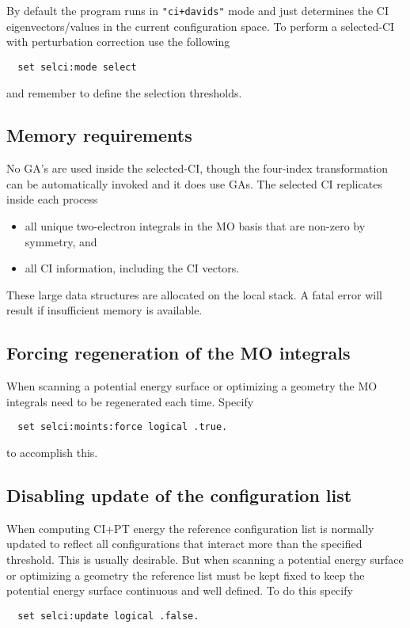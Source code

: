By default the program runs in \verb="ci+davids"= mode and just
determines the CI eigenvectors/values in the current configuration
space.  To perform a selected-CI with perturbation correction use the
following
\begin{verbatim}
  set selci:mode select
\end{verbatim}
and remember to define the selection thresholds.

\subsection{Memory requirements}

No GA's are used inside the selected-CI, though the four-index
transformation can be automatically invoked and it does use GAs.  The
selected CI replicates inside each process
\begin{itemize}
\item all unique two-electron integrals in the MO basis that are
  non-zero by symmetry, and
\item all CI information, including the CI vectors.
\end{itemize}
These large data structures are allocated on the local stack.  A fatal
error will result if insufficient memory is available.


\subsection{Forcing regeneration of the MO integrals}

When scanning a potential energy surface or optimizing a geometry the
MO integrals need to be regenerated each time.  Specify
\begin{verbatim}
  set selci:moints:force logical .true.
\end{verbatim}
to accomplish this.

\subsection{Disabling update of the configuration list}

When computing CI+PT energy the reference configuration list is
normally updated to reflect all configurations that interact more than
the specified threshold.  This is usually desirable.  But
when scanning a potential energy surface or optimizing a geometry the
reference list must be kept fixed to keep the potential energy surface
continuous and well defined.  To do this specify
\begin{verbatim}
  set selci:update logical .false.
\end{verbatim}


